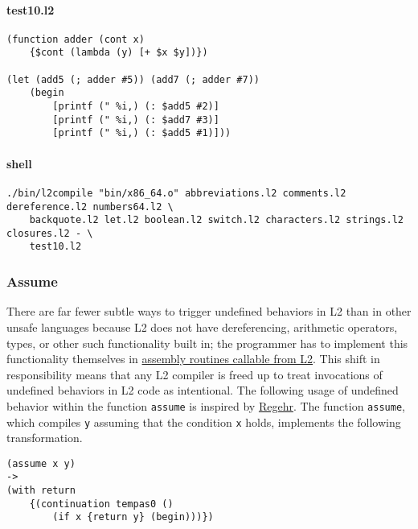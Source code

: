 \documentclass[]{article}
\let\oldparagraph\paragraph
\renewcommand{\paragraph}[1]{\oldparagraph{#1}\mbox{}}
\begin{document}
\hypertarget{test10.l2}{%
\paragraph{test10.l2}\label{test10.l2}}

\begin{verbatim}
(function adder (cont x)
    {$cont (lambda (y) [+ $x $y])})

(let (add5 (; adder #5)) (add7 (; adder #7))
    (begin
        [printf (" %i,) (: $add5 #2)]
        [printf (" %i,) (: $add7 #3)]
        [printf (" %i,) (: $add5 #1)]))
\end{verbatim}

\hypertarget{shell-9}{%
\paragraph{shell}\label{shell-9}}

\begin{verbatim}
./bin/l2compile "bin/x86_64.o" abbreviations.l2 comments.l2 dereference.l2 numbers64.l2 \
    backquote.l2 let.l2 boolean.l2 switch.l2 characters.l2 strings.l2 closures.l2 - \
    test10.l2
\end{verbatim}

\hypertarget{assume}{%
\subsubsection{Assume}\label{assume}}

There are far fewer subtle ways to trigger undefined behaviors in L2
than in other unsafe languages because L2 does not have dereferencing,
arithmetic operators, types, or other such functionality built in; the
programmer has to implement this functionality themselves in
\href{assets/x86_64.s}{assembly routines callable from L2}. This shift
in responsibility means that any L2 compiler is freed up to treat
invocations of undefined behaviors in L2 code as intentional. The
following usage of undefined behavior within the function
\texttt{assume} is inspired by
\href{https://blog.regehr.org/archives/1096}{Regehr}. The function
\texttt{assume}, which compiles \texttt{y} assuming that the condition
\texttt{x} holds, implements the following transformation.

\begin{verbatim}
(assume x y)
->
(with return
    {(continuation tempas0 ()
        (if x {return y} (begin)))})
\end{verbatim}
\end{document}
